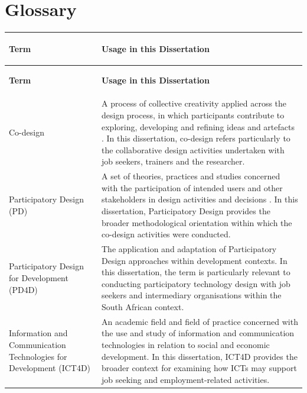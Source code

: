\chapter*{Glossary}
\thispagestyle{plain}

\vspace{-0.3cm}

\renewcommand{\arraystretch}{1.25}
\setlength{\tabcolsep}{7pt}

\begin{longtable}{
    >{\bfseries\raggedright\arraybackslash}p{}
    >{\raggedright\arraybackslash}p{}
}

\rowcolor{black!10}
\textbf{Term} & \textbf{Usage in this Dissertation} \\
\hline
\endfirsthead

\rowcolor{black!10}
\textbf{Term} & \textbf{Usage in this Dissertation} \\
\hline
\endhead

Co-design &
A process of collective creativity applied across the design process, in which participants contribute to exploring, developing and refining ideas and artefacts \cite{sanders2008}. In this dissertation, co-design refers particularly to the collaborative design activities undertaken with job seekers, trainers and the researcher. \\
\hline

Participatory Design (PD) &
A set of theories, practices and studies concerned with the participation of intended users and other stakeholders in design activities and decisions \cite{muller2007}. In this dissertation, Participatory Design provides the broader methodological orientation within which the co-design activities were conducted. \\
\hline

Participatory Design for Development (PD4D) &
The application and adaptation of Participatory Design approaches within development contexts. In this dissertation, the term is particularly relevant to conducting participatory technology design with job seekers and intermediary organisations within the South African context. \\
\hline

Information and Communication Technologies for Development (ICT4D) &
An academic field and field of practice concerned with the use and study of information and communication technologies in relation to social and economic development. In this dissertation, ICT4D provides the broader context for examining how ICTs may support job seeking and employment-related activities. \\
\hline


\end{longtable}
